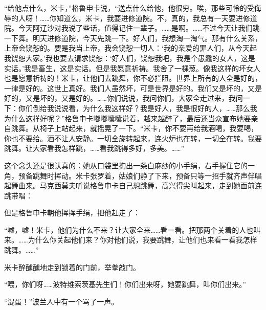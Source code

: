 \par “给他点什么，米卡，”格鲁申卡说，“送点什么给他，他很穷。唉，那些可怜的受侮辱的人呀！……你知道么，米卡，我要进修道院。不，真的，我总有一天要进修道院。今天阿辽沙对我说了些话，值得记住一辈子。……是啊。……不过今天让我们跳一下舞。明天进修道院，今天先跳一下。好人们，我想淘一淘气。那有什么关系，上帝会饶恕的。要是我当上帝，我会饶恕一切人：‘我的亲爱的罪人们，从今天起我饶恕大家。’我也要去请求饶恕：‘好人们，饶恕我吧，我是个愚蠢的女人，这是实话。’我是畜生，这是实话。但是我愿意祈祷。我舍了一棵葱。像我这样的坏女人也是愿意祈祷的！米卡，让他们去跳舞，你不必拦阻。世界上所有的人全是好的，一律是好的。这世上真好。我们人虽然坏，可是世界是好的。我们又是坏的，又是好的，又是坏的，又是好的。……你们说说，我问你们，大家全走过来，我问一下：你们倒给我说说看，为什么我这样好？我是好人，我是很好的人，……那么我为什么这样好呢？”格鲁申卡嘟嘟囔囔说着，越来越醉了，最后还当众宣布她要亲自跳舞。从椅子上站起来，就摇晃了一下。“米卡，你不要再给我酒喝，我要喝，你也不要给。酒不让人安静。一切全旋转起来，连火炉也在转，一切全在转。我要跳舞。让大家看我怎样跳，……看我跳得多好，多美。……”
\par 这个念头还是很认真的：她从口袋里掏出一条白麻纱的小手绢，右手握住它的一角，预备跳舞时挥动。米卡张罗着，姑娘们静了下来，预备只等一招手就齐声伴唱起舞曲来。马克西莫夫听说格鲁申卡自己想跳舞，高兴得尖叫起来，走到她面前连跳带唱：
\par 但是格鲁申卡朝他挥挥手绢，把他赶走了：
\par “嘘，嘘！米卡，他们为什么不来？让大家全来……看一看。把那两个关着的人也叫来。……为什么你关起他们来？你对他们说，我要跳舞，让他们也来看一看我怎样跳舞。……”
\par 米卡醉醺醺地走到锁着的门前，举拳敲门。
\par “喂，你们呀……波特维索茨基先生们！你们出来呀，她要跳舞，叫你们出来。”
\par “混蛋！”波兰人中有一个骂了一声。
